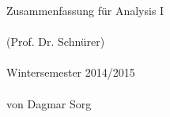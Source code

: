 \begin{titlepage}
	\phantom{text}\vfill
	\hspace*{2.5cm}\begin{minipage}{\textwidth-3cm}
		\begin{center}
			\Huge{Zusammenfassung für Analysis I}\\\ \\
			\Large{(Prof. Dr. Schnürer)}\\\ \\
			\Large{Wintersemester 2014/2015}\\\ \\
			\large{von Dagmar Sorg}
		\end{center}
	\end{minipage}
	\vfill	\phantom{text}
	\end{titlepage}